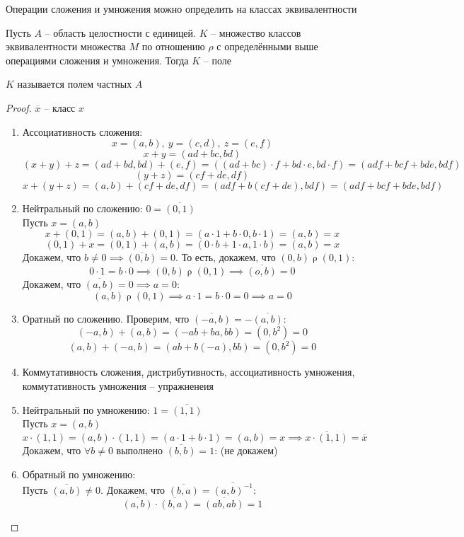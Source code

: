 \begin{implication}
    Операции сложения и умножения можно определить на классах эквивалентности
\end{implication}

\begin{theorem}
	Пусть $A$ -- область целостности с единицей. $K$ -- множество классов эквивалентности множества $M$ по отношению $\rho$ с определёнными выше операциями сложения и умножения. Тогда $K$ -- поле
\end{theorem}

\begin{definition}
    $K$ называется полем частных $A$
\end{definition}

\begin{proof}
    $\overline{x}$ -- класс $x$
    \begin{enumerate}
    	\item Ассоциативность сложения:
        $$ x = (a,b), ~ y = (c,d), ~ z = (e,f) $$
        $$ x + y = (ad + bc, bd) $$
        $$ (x + y) + z = (ad + bd, bd) + (e,f) = ((ad + bc) \cdot f + bd \cdot e, bd \cdot f) = (adf + bcf + bde, bdf) $$
        $$ (y + z) = (cf + de, df) $$
        $$ x + (y + z) = (a,b) + (cf + de, df) = (adf + b(cf + de), bdf) = (adf + bcf + bde, bdf) $$
        \item Нейтральный по сложению: $0 = \overline{(0, 1)} $ \\
        Пусть $x = (a,b) $
        $$ x + (0,1) = (a,b) + (0,1) = (a \cdot 1 + b \cdot 0, b \cdot 1) = (a,b) = x $$
        $$ (0,1) + x = (0,1) + (a,b) = (0 \cdot b + 1 \cdot a, 1 \cdot b) = (a,b) = x $$
        Докажем, что $b \ne 0 \implies \overline{(0,b)} = 0 $. То есть, докажем, что $(0,b) \mathrel\rho (0,1) $:
        $$ 0 \cdot 1 = b \cdot 0 \implies (0,b) \mathrel\rho (0,1) \implies \overline{(o,b)} = 0 $$
        Докажем, что $\overline{(a,b)} = 0 \implies a = 0$:
        $$ (a,b) \mathrel\rho (0,1) \implies a \cdot 1 = b \cdot 0 = 0 \implies a = 0$$
        \item Оратный по сложению. Проверим, что $\overline{(-a,b)} = - \overline{(a,b)}$:
        $$ (-a,b) + (a,b) = (-ab + ba, bb) = (0, b^2) = 0 $$
        $$ (a,b) + (-a,b) = (ab + b(-a), bb) = (0, b^2) = 0 $$
        \item Коммутативность сложения, дистрибутивность, ассоциативность умножения, коммутативность умножения -- упражненеия
        \item Нейтральный по умножению: $ 1 = \overline{(1,1)} $ \\
        Пусть $x = (a,b) $
        $$ x \cdot (1,1) = (a,b) \cdot (1,1) = (a \cdot 1 + b \cdot 1) = (a,b) = x \implies \overline{x \cdot (1,1)} = \overline{x} $$
        Докажем, что $ \forall b \ne 0 $ выполнено $ \overline{(b,b)} = 1 $: (не докажем)
        \item Обратный по умножению: \\
        Пусть $ \overline{(a,b)} \ne 0 $. Докажем, что $ \overline{(b,a)} = \overline{(a,b)^{-1}} $:
        $$ \overline{(a,b)} \cdot \overline{(b,a)} = \overline{(ab,ab)} = 1 $$
    \end{enumerate}
\end{proof}

